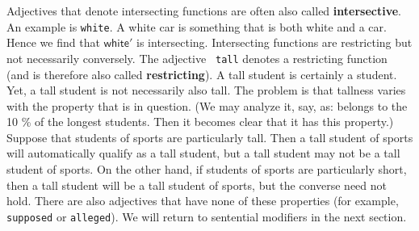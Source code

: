 Adjectives that denote intersecting functions are often also
called \textbf{intersective}. An example is {\tt white}. A white car
is something that is both white and a car. Hence we find that
$\mathsf{white}'$ is intersecting. Intersecting functions are
restricting but not necessarily conversely. The adjective {\tt
tall} denotes a restricting function (and is therefore also called
\textbf{restricting}). A tall student is certainly a student. Yet, a
tall student is not necessarily also tall. The problem is that
tallness varies with the property that is in question. (We may
analyze it, say, as: belongs to the 10 \% of the longest students.
Then it becomes clear that it has this property.) Suppose that
students of sports are particularly tall. Then a tall student of
sports will automatically qualify as a tall student, but a tall
student may not be a tall student of sports. On the other hand, if
students of sports are particularly short, then a tall student
will be a tall student of sports, but the converse need not hold.
There are also adjectives that have none of these properties (for 
example, {\tt supposed} or {\tt alleged}). We will return to 
sentential modifiers in the next section.

